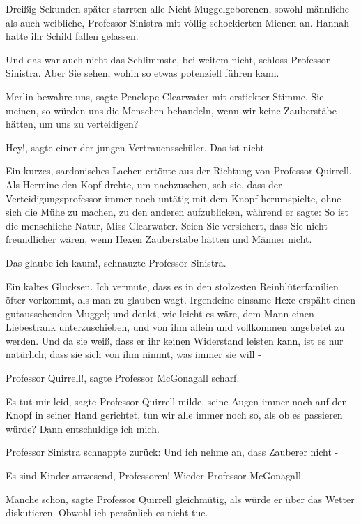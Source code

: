 Dreißig Sekunden später starrten alle Nicht-Muggelgeborenen, sowohl männliche
als auch weibliche, Professor Sinistra mit völlig schockierten Mienen an. Hannah
hatte ihr Schild fallen gelassen.

\glqq{}Und das war auch nicht das Schlimmste, bei weitem nicht\grqq{}, schloss
Professor Sinistra. \glqq{}Aber Sie sehen, wohin so etwas potenziell führen
kann.\grqq{}

\glqq{}Merlin bewahre uns\grqq{}, sagte Penelope Clearwater mit erstickter
Stimme. \glqq{}Sie meinen, so würden uns die Menschen behandeln, wenn wir keine
Zauberstäbe hätten, um uns zu verteidigen?\grqq{}

\glqq{}Hey!\grqq{}, sagte einer der jungen Vertrauensschüler. \glqq{}Das ist nicht
-\grqq{}

Ein kurzes, sardonisches Lachen ertönte aus der Richtung von Professor Quirrell.
Als Hermine den Kopf drehte, um nachzusehen, sah sie, dass der
Verteidigungsprofessor immer noch untätig mit dem Knopf herumspielte, ohne sich
die Mühe zu machen, zu den anderen aufzublicken, während er sagte: \glqq{}So ist
die menschliche Natur, Miss Clearwater. Seien Sie versichert, dass Sie nicht
freundlicher wären, wenn Hexen Zauberstäbe hätten und Männer nicht.\grqq{}

\glqq{}Das glaube ich kaum!\grqq{}, schnauzte Professor Sinistra.

Ein kaltes Glucksen. \glqq{}Ich vermute, dass es in den stolzesten
Reinblüterfamilien öfter vorkommt, als man zu glauben wagt. Irgendeine einsame
Hexe erspäht einen gutaussehenden Muggel; und denkt, wie leicht es wäre, dem
Mann einen Liebestrank unterzuschieben, und von ihm allein und vollkommen
angebetet zu werden. Und da sie weiß, dass er ihr keinen Widerstand leisten
kann, ist es nur natürlich, dass sie sich von ihm nimmt, was immer sie will
-\grqq{}

\glqq{}Professor Quirrell!\grqq{}, sagte Professor McGonagall scharf.

\glqq{}Es tut mir leid\grqq{}, sagte Professor Quirrell milde, seine Augen immer
noch auf den Knopf in seiner Hand gerichtet, \glqq{}tun wir alle immer noch so,
als ob es passieren würde? Dann entschuldige ich mich.\grqq{}

Professor Sinistra schnappte zurück: \glqq{}Und ich nehme an, dass Zauberer nicht
-\grqq{}

\glqq{}Es sind Kinder anwesend, Professoren!\grqq{} Wieder Professor McGonagall.

\glqq{}Manche schon\grqq{}, sagte Professor Quirrell gleichmütig, als würde er
über das Wetter diskutieren. \glqq{}Obwohl ich persönlich es nicht tue.\grqq{}

